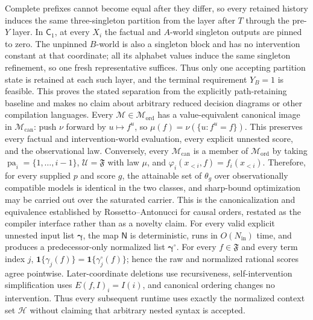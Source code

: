Complete prefixes cannot become equal after they differ, so every retained history induces the same three-singleton partition from the layer after \(T\) through the pre-\(Y\) layer. In \(\mathsf C_1\), at every \(X_i\) the factual and \(A\)-world singleton outputs are pinned to zero. The unpinned \(B\)-world is also a singleton block and has no intervention constant at that coordinate; all its alphabet values induce the same singleton refinement, so one fresh representative suffices. Thus only one accepting partition state is retained at each such layer, and the terminal requirement \(Y_B=1\) is feasible. This proves the stated separation from the explicitly path-retaining baseline and makes no claim about arbitrary reduced decision diagrams or other compilation languages.
Every \(\mathcal M\in\mathcal M_{\mathrm{ord}}\) has a value-equivalent canonical image in \(\mathcal M_{\mathrm{can}}\): push \(\nu\) forward by \(u\mapsto f^u\), so \(\mu(f)=\nu(\{u:f^u=f\})\). This preserves every factual and intervention-world evaluation, every explicit unnested score, and the observational law. Conversely, every \(\mathcal M_{\mathrm{can}}\) is a member of \(\mathcal M_{\mathrm{ord}}\) by taking \(\operatorname{pa}_i=\{1,\ldots,i-1\}\), \(\mathcal U=\mathfrak F\) with law \(\mu\), and \(\varphi_i(x_{<i},f)=f_i(x_{<i})\). Therefore, for every supplied \(p\) and score \(g\), the attainable set of \(\theta_g\) over observationally compatible models is identical in the two classes, and sharp-bound optimization may be carried out over the saturated carrier. This is the canonicalization and equivalence established by Rossetto--Antonucci for causal orders, restated as the compiler interface rather than as a novelty claim.
For every valid explicit unnested input list \(\boldsymbol\gamma\), the map \(\mathsf N\) is deterministic, runs in \(O(N_{\mathrm{in}})\) time, and produces a predecessor-only normalized list \(\boldsymbol\gamma^{\circ}\). For every \(f\in\mathfrak F\) and every term index \(j\), \(\mathbf 1\{\gamma_j(f)\}=\mathbf 1\{\gamma_j^{\circ}(f)\}\); hence the raw and normalized rational scores agree pointwise. Later-coordinate deletions use recursiveness, self-intervention simplification uses \(E(f,I)_i=I(i)\), and canonical ordering changes no intervention. Thus every subsequent runtime uses exactly the normalized context set \(\mathcal H\) without claiming that arbitrary nested syntax is accepted.
